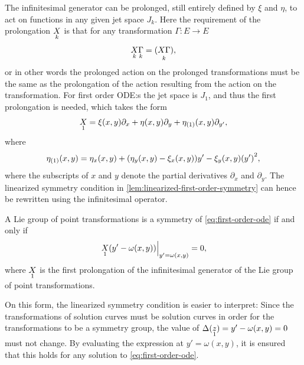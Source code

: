 The infinitesimal generator can be prolonged, still entirely defined by \(\xi\) and \(\eta\), to act on functions in any given jet space \(J_k\).
Here the requirement of the prolongation \(\prolong{X}{k}\) is that for any transformation \(\Gamma: E \to E\)
\begin{equation*}
  \prolong{X}{k} \prolong{\Gamma}{k} = \prolong{\left(X \Gamma\right)}{k},
\end{equation*}
or in other words the prolonged action on the prolonged transformations must be the same as the prolongation of the action resulting from the action on the transformation.
For first order ODE:s the jet space is \(J_1\), and thus the first prolongation is needed, which takes the form
\begin{equation*}
  \prolong{X}{1} =
  \xi(x,y) \partial_x + \eta(x,y) \partial_y + \prolongpart{\eta}{1}(x,y) \partial_{y'},
\end{equation*}
where
\begin{equation*}
  \prolongpart{\eta}{1}(x,y) =
  \eta_x(x,y) + (\eta_y(x,y) - \xi_x(x,y)) y' - \xi_y(x,y) \left(y'\right)^2,
\end{equation*}
where the subscripts of \(x\) and \(y\) denote the partial derivatives \(\partial_x\) and \(\partial_y\).
The linearized symmetry condition in \cref{lem:linearized-first-order-symmetry} can hence be rewritten using the infinitesimal operator.
\begin{lem} \label{lem:linearized-first-order-symmetry-infinitesimal}
  A Lie group of point transformations is a symmetry of \cref{eq:first-order-ode} if and only if
  \begin{equation} \label{eq:linearized-first-order-symmetry}
    \eval{\prolong{X}{1}\left(y' - \omega(x,y)\right)}_{y' = \omega(x,y)} = 0,
  \end{equation}
  where \(\prolong{X}{1}\) is the first prolongation of the infinitesimal generator of the Lie group of point transformations.
\end{lem}
On this form, the linearized symmetry condition is easier to interpret:
Since the transformations of solution curves must be solution curves in order for the transformations to be a symmetry group, the value of \(\Delta(\prolong{z}{1}) = y' - \omega(x,y) = 0\) must not change.
By evaluating the expression at \(y' = \omega(x,y)\), it is ensured that this holds for any solution to \cref{eq:first-order-ode}.

